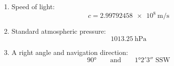 \documentclass{article}
\begin{document}
\begin{enumerate}
    \item Speed of light:
	\[
	c = \qty{2.99792458e8}{\meter\per\second}
	\]
	
	\item Standard atmospheric pressure:
	\[
	\qty{1013.25}{\hecto\pascal}
	\]
	
	\item A right angle and navigation direction:
	\[
	\ang{90}
	\qquad \text{and} \qquad
	\ang{1;2;3} \text{ SSW}
	\]
\end{enumerate}
	
	
\end{document}
